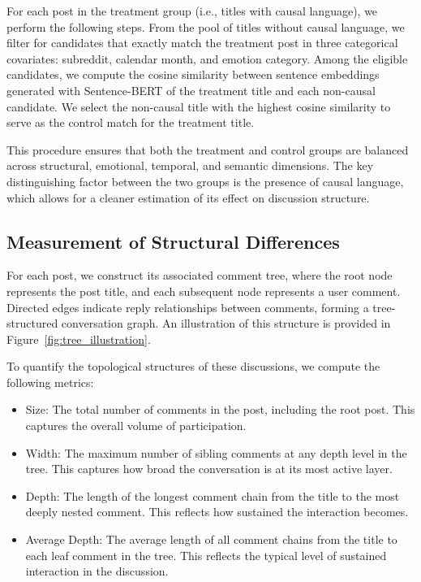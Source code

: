 \documentclass[acmsmall]{acmart}
\begin{document}
For each post in the treatment group (i.e., titles with causal language), we perform the following steps. From the pool of titles without causal language, we filter for candidates that exactly match the treatment post in three categorical covariates: subreddit, calendar month, and emotion category. Among the eligible candidates, we compute the cosine similarity between sentence embeddings generated with Sentence-BERT of the treatment title and each non-causal candidate. We select the non-causal title with the highest cosine similarity to serve as the control match for the treatment title.


This procedure ensures that both the treatment and control groups are balanced across structural, emotional, temporal, and semantic dimensions. The key distinguishing factor between the two groups is the presence of causal language, which allows for a cleaner estimation of its effect on discussion structure.










\subsection{Measurement of Structural Differences}
For each post, we construct its associated comment tree, where the root node represents the post title, and each subsequent node represents a user comment. Directed edges indicate reply relationships between comments, forming a tree-structured conversation graph. An illustration of this structure is provided in Figure~\ref{fig:tree_illustration}.


To quantify the topological structures of these discussions, we compute the following metrics:


\begin{itemize}
    
    \item  Size: The total number of comments in the post, including the root post. This captures the overall volume of participation.
    
    \item  Width: The maximum number of sibling comments at any depth level in the tree. This captures how broad the conversation is at its most active layer.
    
    \item  Depth: The length of the longest comment chain from the title to the most deeply nested comment. This reflects how sustained the interaction becomes.

    \item Average Depth: The average length of all comment chains from the title to each leaf comment in the tree. This reflects the typical level of sustained interaction in the discussion.


\end{itemize}
\end{document}
